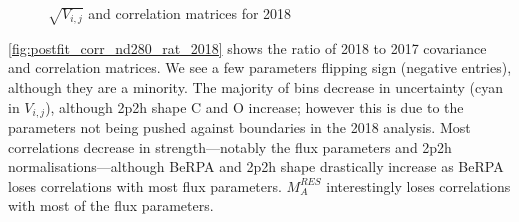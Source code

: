 \begin{figure}[h]
\begin{subfigure}[t]{0.49\textwidth}
		\end{subfigure}
		\caption{$\sqrt{V_{i,j}}$ and correlation matrices for 2018}
		\label{fig:postfit_corr_nd280_2018}
\end{figure}

\autoref{fig:postfit_corr_nd280_rat_2018} shows the ratio of 2018 to 2017 covariance and correlation matrices. We see a few parameters flipping sign (negative entries), although they are a minority. The majority of bins decrease in uncertainty (cyan in $V_{i,j}$), although 2p2h shape C and O increase; however this is due to the parameters not being pushed against boundaries in the 2018 analysis. Most correlations decrease in strength---notably the flux parameters and 2p2h normalisations---although BeRPA and 2p2h shape drastically increase as BeRPA loses correlations with most flux parameters. $M_A^{RES}$ interestingly loses correlations with most of the flux parameters.
